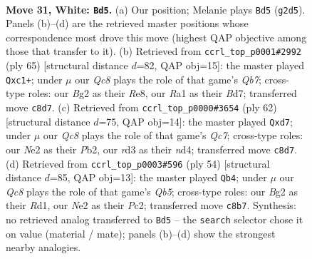 \documentclass[11pt]{article}
\begin{document}
\begin{figure}[p]\centering
\begin{subfigure}{0.46\textwidth}\centering
\resizebox{\linewidth}{!}{%
\newchessgame
\chessboard[
  setfen={2Q5/pp1n1qkp/7p/1P6/3P4/3r4/4NbB1/R4K1R w - - 8 31},
  showmover=false,
  pgfstyle=straightmove, color=movearrow, markmove={g2-d5}
]}
\caption{}
\end{subfigure}\hfill
\begin{subfigure}{0.46\textwidth}\centering
\resizebox{\linewidth}{!}{%
\newchessgame
\chessboard[
  setfen={4r1k1/3b1pp1/3B1n1p/2p5/4P3/7P/1qB2PP1/R1Q3K1 b - - 2 33},
  showmover=false,
  pgfstyle=straightmove, color=movearrow, markmove={b2-c1}
]}
\caption{}
\end{subfigure}
\\[4pt]
\begin{subfigure}{0.46\textwidth}\centering
\resizebox{\linewidth}{!}{%
\newchessgame
\chessboard[
  setfen={3r2k1/ppQq2p1/5pb1/8/3n1PP1/8/PP3BB1/4R1K1 w - - 2 32},
  showmover=false,
  pgfstyle=straightmove, color=movearrow, markmove={c7-d7}
]}
\caption{}
\end{subfigure}\hfill
\begin{subfigure}{0.46\textwidth}\centering
\resizebox{\linewidth}{!}{%
\newchessgame
\chessboard[
  setfen={2k5/2q2p1r/1pb5/1Q2Pp2/5P2/P1p1B3/2P5/2KR4 w - - 2 28},
  showmover=false,
  pgfstyle=straightmove, color=movearrow, markmove={b5-b4}
]}
\caption{}
\end{subfigure}
\caption{\textbf{Move 31, White: \texttt{Bd5}.} (a) Our position; Melanie plays \texttt{Bd5} (\texttt{g2d5}). Panels (b)--(d) are the retrieved master positions whose correspondence most drove this move (highest QAP objective among those that transfer to it). (b) Retrieved from \texttt{ccrl\_top\_p0001\#2992} (ply 65) [structural distance $d$=82, QAP obj=15]: the master played \texttt{Qxc1+}; under $\mu$ our \emph{Qc8} plays the role of that game's \emph{Qb7}; cross-type roles: our \emph{B}g2 as their \emph{R}e8, our \emph{R}a1 as their \emph{B}d7; transferred move \texttt{c8d7}. (c) Retrieved from \texttt{ccrl\_top\_p0000\#3654} (ply 62) [structural distance $d$=75, QAP obj=14]: the master played \texttt{Qxd7}; under $\mu$ our \emph{Qc8} plays the role of that game's \emph{Qc7}; cross-type roles: our \emph{N}e2 as their \emph{P}b2, our \emph{r}d3 as their \emph{n}d4; transferred move \texttt{c8d7}. (d) Retrieved from \texttt{ccrl\_top\_p0003\#596} (ply 54) [structural distance $d$=85, QAP obj=13]: the master played \texttt{Qb4}; under $\mu$ our \emph{Qc8} plays the role of that game's \emph{Qb5}; cross-type roles: our \emph{B}g2 as their \emph{R}d1, our \emph{N}e2 as their \emph{P}c2; transferred move \texttt{c8b7}. Synthesis: no retrieved analog transferred to \texttt{Bd5} -- the \texttt{search} selector chose it on value (material / mate); panels (b)--(d) show the strongest nearby analogies.}
\label{fig:thought-m60}
\end{figure}
\end{document}
